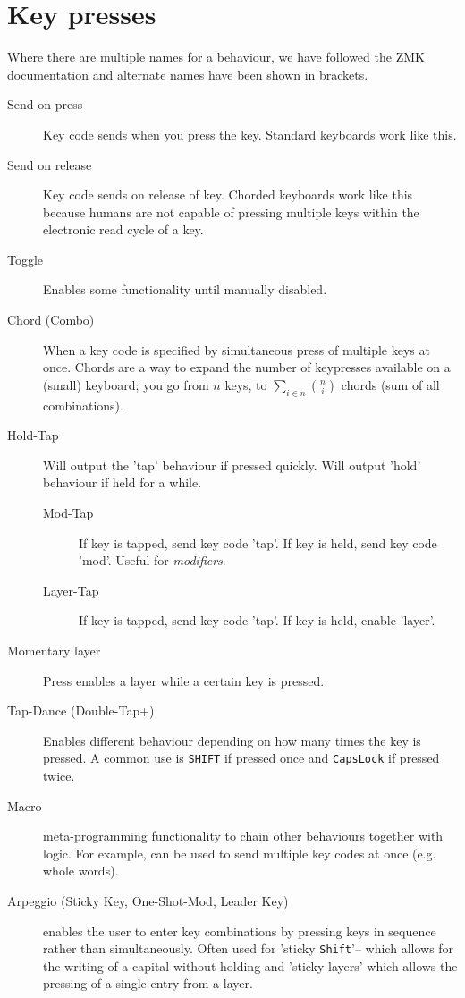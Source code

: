 \documentclass[logo,bsc,singlespacing,parskip]{infthesis}
\begin{document}
\section{Key presses}
\label{sec:orga9873e1}
Where there are multiple names for a behaviour, we have followed the ZMK \autocite{ZMKFirmware} documentation and alternate names have been shown in brackets.

\begin{mdframed}
\begin{description}
\item[{Send on press}] Key code sends when you press the key.
Standard keyboards work like this.
\item[{Send on release}] Key code sends on release of key.
Chorded keyboards work like this because humans are not capable of pressing multiple keys within the electronic read cycle of a key.
\item[{Toggle}] Enables some functionality until manually disabled.
\item[{Chord (Combo)}] When a key code is specified by simultaneous press of multiple keys at once.
Chords are a way to expand the number of keypresses available on a (small) keyboard; you go from \(n\) keys, to \(\sum_{i \in n}{ n \choose i}\) chords (sum of all combinations).
\item[{Hold-Tap}] Will output the 'tap' behaviour if pressed quickly. Will output 'hold' behaviour if held for a while.
\begin{description}
\item[{Mod-Tap}] If key is tapped, send key code 'tap'. If key is held, send key code 'mod'. Useful for \emph{modifiers}.
\item[{Layer-Tap}] If key is tapped, send key code 'tap'. If key is held, enable 'layer'.
\end{description}
\item[{Momentary layer}] Press enables a layer while a certain key is pressed.
\item[{Tap-Dance (Double-Tap+)}] Enables different behaviour depending on how many times the key is pressed. A common use is \texttt{SHIFT} if pressed once and \texttt{CapsLock} if pressed twice.
\item[{Macro}] meta-programming functionality to chain other behaviours together with logic.
For example, can be used to send multiple key codes at once (e.g. whole words).
\item[{Arpeggio (Sticky Key, One-Shot-Mod, Leader Key)}] enables the user to enter key combinations by pressing keys in sequence rather than simultaneously.
Often used for 'sticky \texttt{Shift}'-- which allows for the writing of a capital without holding and 'sticky layers' which allows the pressing of a single entry from a layer.
\end{description}
\end{mdframed}
\end{document}
